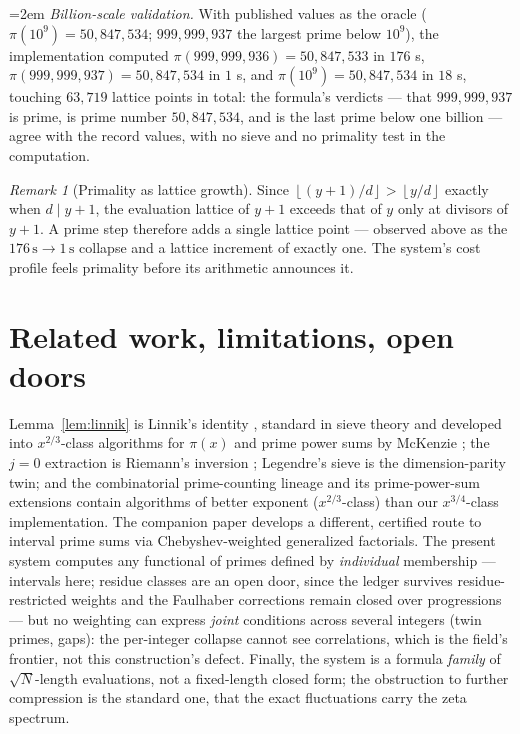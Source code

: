 \documentclass[11pt]{article}
\theoremstyle{remark}
\newtheorem{remark}{Remark}
\newcommand{\fl}[1]{\left\lfloor #1 \right\rfloor}
\begin{document}
{\emergencystretch=2em
\emph{Billion-scale validation.} With published values as the oracle
($\pi(10^9) = 50{,}847{,}534$; $999{,}999{,}937$ the largest prime below $10^9$), the implementation
computed $\pi(999{,}999{,}936) = 50{,}847{,}533$ in $176$ s, $\pi(999{,}999{,}937) = 50{,}847{,}534$ in
$1$ s, and $\pi(10^9) = 50{,}847{,}534$ in $18$ s, touching $63{,}719$ lattice points in total: the
formula's verdicts --- that $999{,}999{,}937$ is prime, is prime number $50{,}847{,}534$, and is the
last prime below one billion --- agree with the record values, with no sieve and no primality test in
the computation.\par}

\begin{remark}[Primality as lattice growth]
Since $\fl{(y+1)/d} > \fl{y/d}$ exactly when $d \mid y+1$, the evaluation lattice of $y+1$ exceeds that
of $y$ only at divisors of $y+1$. A prime step therefore adds a single lattice point --- observed above
as the $176\,\mathrm{s} \to 1\,\mathrm{s}$ collapse and a lattice increment of exactly one. The
system's cost profile feels primality before its arithmetic announces it.
\end{remark}

\section{Related work, limitations, open doors}

Lemma~\ref{lem:linnik} is Linnik's identity \cite{Linnik}, standard in sieve theory \cite{FI} and
developed into $x^{2/3}$-class algorithms for $\pi(x)$ and prime power sums by McKenzie
\cite{McKenzie}; the $j=0$ extraction is Riemann's inversion \cite{Riemann,Edwards}; Legendre's sieve is the
dimension-parity twin; and the combinatorial prime-counting lineage
\cite{DR,Staple} and its prime-power-sum extensions \cite{Orlov,Lucy} contain algorithms of better
exponent ($x^{2/3}$-class) than our $x^{3/4}$-class implementation. The companion paper \cite{Companion} develops a
different, certified route to interval prime sums via Chebyshev-weighted generalized factorials. The
present system computes any functional of primes defined by \emph{individual} membership --- intervals
here; residue classes are an open door, since the ledger survives residue-restricted weights and the
Faulhaber corrections remain closed over progressions --- but no weighting can express \emph{joint}
conditions across several integers (twin primes, gaps): the per-integer collapse cannot see
correlations, which is the field's frontier, not this construction's defect. Finally, the system is a
formula \emph{family} of $\sqrt N$-length evaluations, not a fixed-length closed form; the obstruction
to further compression is the standard one, that the exact fluctuations carry the zeta spectrum.
\end{document}
